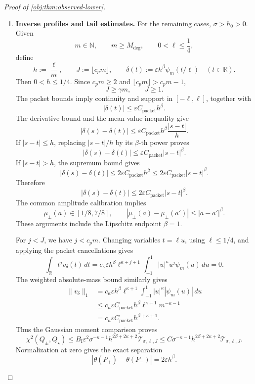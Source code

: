 \documentclass[11pt]{article}
\begin{document}
\begin{proof}[Proof of \cref{obj:thm:observed-lower}]
\begin{enumerate}
\item \textbf{Inverse profiles and tail estimates.}
For the remaining cases, \(\sigma>h_0>0\). Given
\[
m\in\mathbb N,\qquad m\ge M_{\mathrm{deg}},\qquad
0<\ell\le\frac14,
\]
define
\[
h:=\frac{\ell}{m},\qquad
J:=\lfloor c_pm\rfloor,\qquad
\delta(t):=\varepsilon h^\beta\psi_m(t/\ell)
\quad(t\in\mathbb R).
\]
Then \(0<h\le1/4\). Since \(c_pm\ge2\) and
\(\lfloor c_pm\rfloor>c_pm-1\),
\[
J\ge\gamma m,\qquad J\ge1.
\]
The packet bounds imply continuity and support in \([-\ell,\ell]\), together with
\[
|\delta(t)|\le\varepsilon C_{\mathrm{packet}}h^\beta.
\]
The derivative bound and the mean-value inequality give
\[
|\delta(s)-\delta(t)|
\le\varepsilon C_{\mathrm{packet}}h^\beta\frac{|s-t|}{h}.
\]
If \(|s-t|\le h\), replacing \(|s-t|/h\) by its \(\beta\)-th power proves
\[
|\delta(s)-\delta(t)|
\le\varepsilon C_{\mathrm{packet}}|s-t|^\beta.
\]
If \(|s-t|>h\), the supremum bound gives
\[
|\delta(s)-\delta(t)|
\le2\varepsilon C_{\mathrm{packet}}h^\beta
\le2\varepsilon C_{\mathrm{packet}}|s-t|^\beta.
\]
Therefore
\[
|\delta(s)-\delta(t)|
\le2\varepsilon C_{\mathrm{packet}}|s-t|^\beta.
\]
The common amplitude calibration implies
\[
\mu_\pm(a)\in[1/8,7/8],\qquad
|\mu_\pm(a)-\mu_\pm(a')|\le|a-a'|^\beta.
\]
These arguments include the Lipschitz endpoint \(\beta=1\).

For \(j<J\), we have \(j<c_pm\). Changing variables \(t=\ell u\), using \(\ell\le1/4\), and applying the packet cancellations gives
\[
\int_{\mathbb R}t^jv_\delta(t)\,dt
=
c_\kappa\varepsilon h^\beta\ell^{\kappa+j+1}
\int_{-1}^{1}|u|^\kappa u^j\psi_m(u)\,du
=0.
\]
The weighted absolute-mass bound similarly gives
\[
\begin{aligned}
\|v_\delta\|_1
&=
c_\kappa\varepsilon h^\beta\ell^{\kappa+1}
\int_{-1}^{1}|u|^\kappa|\psi_m(u)|\,du\\
&\le
c_\kappa\varepsilon C_{\mathrm{packet}}
h^\beta\ell^{\kappa+1}m^{-\kappa-1}\\
&=
c_\kappa\varepsilon C_{\mathrm{packet}}h^{\beta+\kappa+1}.
\end{aligned}
\]
Thus the Gaussian moment comparison proves
\[
\chi^2(Q_\pm,Q_\star)
\le
B_{\mathrm I}\varepsilon^2
\sigma^{-\kappa-1}h^{2\beta+2\kappa+2}
\mathcal T_{\sigma,\ell,J}
\le
C\sigma^{-\kappa-1}h^{2\beta+2\kappa+2}
\mathcal T_{\sigma,\ell,J}.
\]
Normalization at zero gives the exact separation
\[
|\theta(P_+)-\theta(P_-)|
=2\varepsilon h^\beta.
\]


\end{enumerate}
\end{proof}
\end{document}
